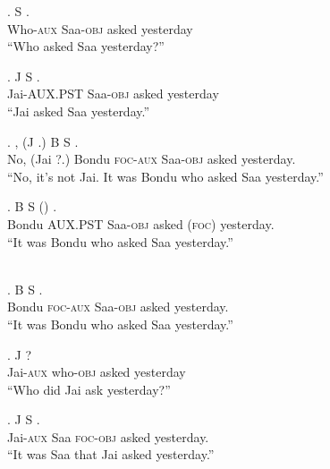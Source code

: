 \documentclass{assets/fieldnotes}
\begin{document}
\exg.  S  .\\
Who-\textsc{aux} Saa-\textsc{obj} asked yesterday\\
``Who asked Saa yesterday?''

\exg. J S  .\\
Jai-\textsc{AUX.PST} Saa-\textsc{obj} asked yesterday\\
``Jai asked Saa yesterday.''

\exg. , (J .) B  S  .\\
No, (Jai ?.) Bondu \textsc{foc-aux} Saa-\textsc{obj} asked yesterday.\\
``No, it's not Jai. It was Bondu who asked Saa yesterday.''

\exg. B  S  () .\\
Bondu \textsc{AUX.PST} Saa-\textsc{obj} asked (\textsc{foc}) yesterday.\\
``It was Bondu who asked Saa yesterday.''\\
\\

\exg. B  S  .\\
Bondu \textsc{foc-aux} Saa-\textsc{obj} asked yesterday.\\
``It was Bondu who asked Saa yesterday.''\\

\exg. J   ?\\
Jai-\textsc{aux} who-\textsc{obj} asked yesterday\\
``Who did Jai ask yesterday?''

\exg. J S   .\\
Jai-\textsc{aux} Saa \textsc{foc-obj} asked yesterday.\\
``It was Saa that Jai asked yesterday.''
\end{document}

